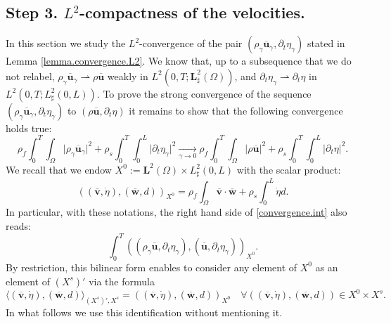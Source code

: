 \documentclass[11pt]{article}
\theoremstyle{remark}
\theoremstyle{definition}
\newcommand{\ug}{\boldsymbol{u}}
\newcommand{\vg}{\boldsymbol{v}}
\newcommand{\wg}{\boldsymbol{w}}
\newcommand{\BS}[1]{\boldsymbol{#1}}
\let\CM\Omega
\begin{document}
\subsection{Step 3. $L^2$-compactness of the velocities.}

In this section we study the $L^{2}$\nobreakdash-convergence of the pair $(\rho_{\gamma}\overline{\ug}_{\gamma},\partial_{t}\eta_{\gamma})$ stated in Lemma \ref{lemma.convergence.L2}.
We know that, up to a subsequence that we do not relabel, $\rho_{\gamma}\overline{\ug}_{\gamma}\rightharpoonup\rho\overline{\ug}$ weakly in $L^{2}(0,T;\BS{L}_\sharp^{2}(\CM))$, and $\partial_t\eta_\gamma \rightharpoonup \partial_{t}\eta$ in $L^2(0,T;L^2_{\sharp}(0,L))$. To prove the strong convergence of the sequence $(\rho_{\gamma}\overline{\ug}_{\gamma},\partial_{t}\eta_{\gamma})$ to $(\rho\overline{\ug},\partial_{t}\eta)$ it remains to show that the following convergence holds true:
\begin{equation}\label{convergence.int}
\rho_{f}\int_{0}^{T}\int_{\CM}\vert \rho_{\gamma}\overline{\ug}_{\gamma}\vert^{2}+\rho_{s}\int_{0}^{T}\int_{0}^{L}\vert\partial_{t}\eta_{\gamma}\vert^{2}\underset{\gamma\to 0}{\to}\rho_{f}\int_{0}^{T}\int_{\CM}\vert \rho\overline{\ug}\vert^{2}+\rho_{s}\int_{0}^{T}\int_{0}^{L}\vert\partial_{t}\eta\vert^{2}.
\end{equation}
We recall that we endow $X^0 := \mathbf{L}^2(\Omega) \times L^2_{\sharp}(0,L)$ with the scalar product:
\[
((\overline{\vg},\dot{\eta}), (\overline{\wg},d))_{X^0} = \rho_f \int_{\Omega} \overline{\vg} \cdot \overline{\wg} + \rho_s \int_{0}^L \dot{\eta} d.
\]
In particular, with these notations, the right hand side of \eqref{convergence.int} also reads:
\[
\int_0^T ((\rho_{\gamma}\overline{\ug},\partial_t \eta_{\gamma}), (\overline{\ug},\partial_t \eta_{\gamma}))_{X^0}.
\]
By restriction, this bilinear form enables to consider any element of $X^0$ as an element of $(X^s)'$ via the formula
\begin{equation} \label{eq:embedX0}
\langle (\overline{\vg},\dot{\eta}), (\overline{\wg},d) \rangle_{(X^s)',X^s } = ((\overline{\vg},\dot{\eta}), (\overline{\wg},d))_{X^0}
\quad \forall ((\overline{\vg},\dot{\eta}),(\overline{\wg},d)) \in X^0 \times X^s.
\end{equation}
In what follows we use this identification without mentioning it.
\end{document}
